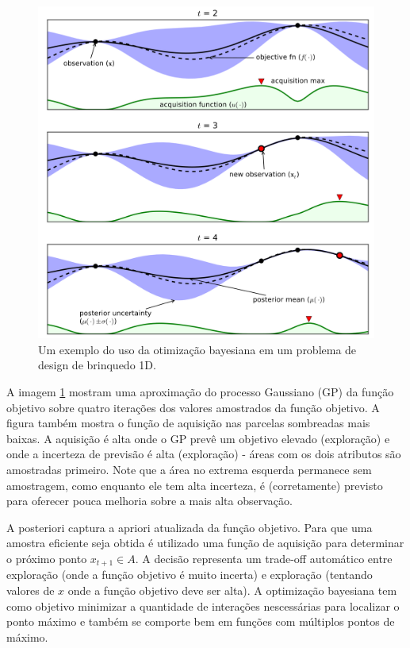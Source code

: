 \documentclass[
	12pt,				%
	openright,			%
	twoside,			%
	a4paper,			%
	english,			%
	french,				%
	spanish,			%
	brazil,				%
]{abntex2}
\begin{document}
\begin{figure}
\centering
\includegraphics[width=\textwidth,height=0.5\textheight]{images/bo.png}
\caption{Um exemplo do uso da otimização bayesiana em um problema de
design de brinquedo 1D.\label{bo}}
\end{figure}

A imagem \ref{bo} mostram uma aproximação do processo Gaussiano (GP) da
função objetivo sobre quatro iterações dos valores amostrados da função
objetivo. A figura também mostra o função de aquisição nas parcelas
sombreadas mais baixas. A aquisição é alta onde o GP prevê um objetivo
elevado (exploração) e onde a incerteza de previsão é alta (exploração)
- áreas com os dois atributos são amostradas primeiro. Note que a área
no extrema esquerda permanece sem amostragem, como enquanto ele tem alta
incerteza, é (corretamente) previsto para oferecer pouca melhoria sobre
a mais alta observação.

A posteriori captura a apriori atualizada da função objetivo. Para que
uma amostra eficiente seja obtida é utilizado uma função de aquisição
para determinar o próximo ponto \(x_{t+1} \in A\). A decisão representa
um trade-off automático entre exploração (onde a função objetivo é muito
incerta) e exploração (tentando valores de \(x\) onde a função objetivo
deve ser alta). A optimização bayesiana tem como objetivo minimizar a
quantidade de interações nescessárias para localizar o ponto máximo e
também se comporte bem em funções com múltiplos pontos de máximo.\\
~\\
\end{document}

